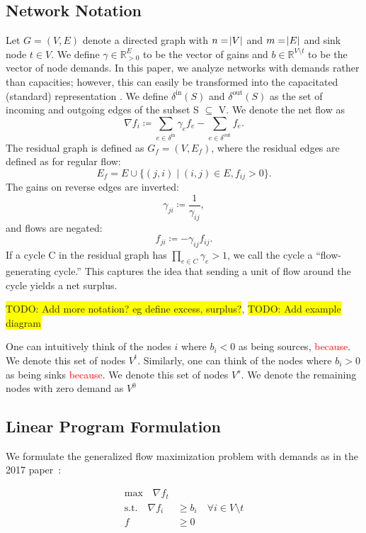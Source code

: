 \documentclass[12pt]{article}
\theoremstyle{definition}
\newcommand{\R}{\mathbb{R}}
\newcommand{\nfi}{\nabla f_i}
\newcommand{\din}{\delta^{\text{in}}}
\newcommand{\dout}{\delta^{\text{out}}}
\newcommand{\vsrc}{V^{t}}
\newcommand{\vsink}{V^{s}}
\newcommand{\vz}{V^{0}}
\newcommand{\rewrite}[1]{\textcolor{red}{#1}}
\newcommand{\todo}[1]{\colorbox{yellow}{TODO: #1}}
\begin{document}
	\subsection{Network Notation}
    Let $G=(V,E)$ denote a directed graph with $n=\abs{V}$ and $m=\abs{E}$ and sink node $t \in V$. We define $\gamma \in \R_{>0}^E$ to be the vector of gains and $b \in \R^{V \setminus t}$ to be the vector of node demands. In this paper, we analyze networks with demands rather than capacities; however, this can easily be transformed into the capacitated (standard) representation \cite{Vegh2013}. We define $\din(S)$ and $\dout(S)$ as the set of incoming and outgoing edges of the subset S $\subseteq$ V. We denote the net flow as
    \[ \nfi \coloneqq \sum_{e \in \din} \gamma_e f_e - \sum_{e \in \dout} f_e.\]
    The residual graph is defined as $G_f = (V, E_f)$, where the residual edges are defined
    as for regular flow:
    \[ E_f = E \cup \{ (j, i) \mid (i, j) \in E, f_{ij} > 0 \}. \]
    The gains on reverse edges are inverted:
    \[ \gamma_{ji} \coloneqq \frac{1}{\gamma_{ij}}, \]
    and flows are negated:
    \[ f_{ji} \coloneqq -\gamma_{ij}f_{ij}. \]
    If a cycle C in the residual graph has $\prod_{e \in C} \gamma_e > 1$,
    we call the cycle a ``flow-generating cycle.'' This captures the idea that sending
    a unit of flow around the cycle yields a net surplus.
    
\todo{Add more notation? eg define excess, surplus?}, \todo{Add example diagram}

One can intuitively think of the nodes $i$ where $b_i < 0$ as being sources, \rewrite{because}. We denote this set of nodes $\vsrc$. Similarly, one can think of the nodes where $b_i > 0$ as being sinks \rewrite{because}. We denote this set of nodes $\vsink$. We denote the remaining nodes with zero demand as $\vz$
    
    \subsection{Linear Program Formulation}
    \label{sec:lp}

	We formulate the generalized flow maximization problem with demands as in the 2017 paper~\cite{Olver2017}:
    
        \begin{align*}\tag{P}
        \text{max} \quad
        \nabla f_t& \\
        \text{s.t.} \quad
        \nabla f_i &\geq b_i \quad \forall i \in V \setminus t \\
        f &\geq 0
        \end{align*}        
\end{document}
